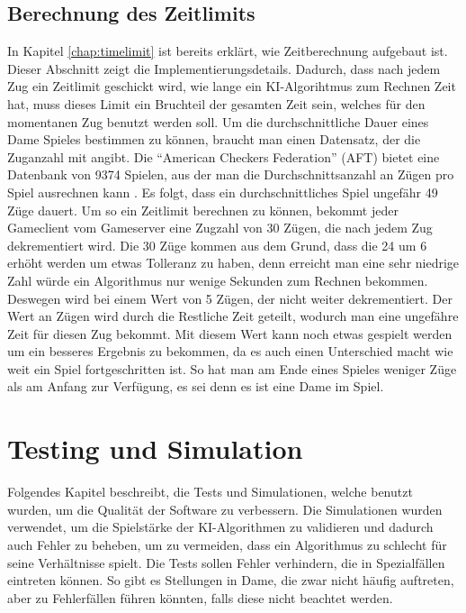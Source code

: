 \documentclass[12pt,a4paper,bibliography=totocnumbered,listof=totocnumbered]{article}
\begin{document}
\subsection{Berechnung des Zeitlimits}
In Kapitel \ref{chap:timelimit} ist bereits erklärt, wie Zeitberechnung aufgebaut ist. Dieser Abschnitt zeigt die Implementierungsdetails.
Dadurch, dass nach jedem Zug ein Zeitlimit geschickt wird, wie lange ein KI-Algorihtmus zum Rechnen Zeit hat, muss dieses Limit ein Bruchteil 
der gesamten Zeit sein, welches für den momentanen Zug benutzt werden soll. Um die durchschnittliche Dauer eines Dame Spieles bestimmen zu können,
braucht man einen Datensatz, der die Zuganzahl mit angibt. Die ``American Checkers Federation'' (AFT) bietet eine Datenbank von 9374 Spielen,
aus der man die Durchschnittsanzahl an Zügen pro Spiel ausrechnen kann \cite{CheckersFederation}. Es folgt, dass ein durchschnittliches Spiel 
ungefähr 49 Züge dauert. Um so ein Zeitlimit berechnen zu können, bekommt jeder Gameclient vom Gameserver eine Zugzahl von 30 Zügen, die nach jedem Zug 
dekrementiert wird. Die 30 Züge kommen aus dem Grund, dass die 24 um 6 erhöht werden um etwas Tolleranz zu haben, denn erreicht man 
eine sehr niedrige Zahl würde ein Algorithmus nur wenige Sekunden zum Rechnen bekommen. Deswegen wird bei einem Wert von 5 Zügen, 
der nicht weiter dekrementiert. Der Wert an Zügen wird durch 
die Restliche Zeit geteilt, wodurch man eine ungefähre Zeit für diesen Zug bekommt. Mit diesem Wert kann noch etwas gespielt werden um 
ein besseres Ergebnis zu bekommen, da es auch einen Unterschied macht wie weit ein Spiel fortgeschritten ist. So hat man am Ende eines Spieles 
weniger Züge als am Anfang zur Verfügung, es sei denn es ist eine Dame im Spiel. 

\pagebreak

\section{Testing und Simulation}
Folgendes Kapitel beschreibt, die Tests und Simulationen, welche benutzt wurden, um die Qualität der Software zu verbessern. Die Simulationen wurden verwendet, um 
die Spielstärke der KI-Algorithmen zu validieren und dadurch auch Fehler zu beheben, um zu vermeiden, dass ein Algorithmus zu schlecht für seine Verhältnisse spielt.
Die Tests sollen Fehler verhindern, die in Spezialfällen eintreten können. So gibt es Stellungen in Dame, die zwar nicht häufig auftreten, 
aber zu Fehlerfällen führen könnten, falls diese nicht beachtet werden.
\end{document}
